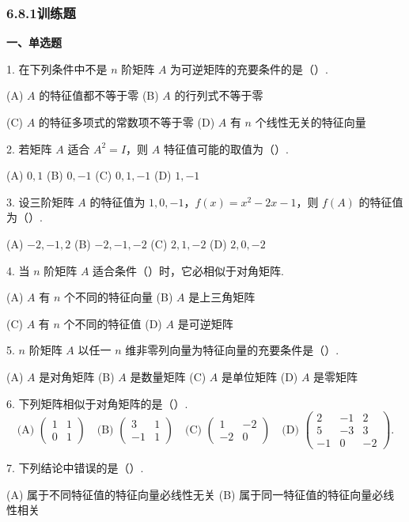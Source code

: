 \documentclass[UTF8,12pt,a4paper,fontset=fandol]{ctexart}
\begin{document}
\subsubsection*{6.8.1\quad 训练题}

\noindent\textbf{一、单选题}

1. 在下列条件中不是 $n$ 阶矩阵 $A$ 为可逆矩阵的充要条件的是（\quad ）.

(A) $A$ 的特征值都不等于零 \qquad (B) $A$ 的行列式不等于零

(C) $A$ 的特征多项式的常数项不等于零 \qquad (D) $A$ 有 $n$ 个线性无关的特征向量

2. 若矩阵 $A$ 适合 $A^2=I$，则 $A$ 特征值可能的取值为（\quad ）.

(A) $0,1$ \qquad (B) $0,-1$ \qquad (C) $0,1,-1$ \qquad (D) $1,-1$

3. 设三阶矩阵 $A$ 的特征值为 $1,0,-1$，$f(x)=x^2-2x-1$，则 $f(A)$ 的特征值为（\quad ）.

(A) $-2,-1,2$ \qquad (B) $-2,-1,-2$ \qquad (C) $2,1,-2$ \qquad (D) $2,0,-2$

4. 当 $n$ 阶矩阵 $A$ 适合条件（\quad ）时，它必相似于对角矩阵.

(A) $A$ 有 $n$ 个不同的特征向量 \qquad (B) $A$ 是上三角矩阵

(C) $A$ 有 $n$ 个不同的特征值 \qquad (D) $A$ 是可逆矩阵

5. $n$ 阶矩阵 $A$ 以任一 $n$ 维非零列向量为特征向量的充要条件是（\quad ）.

(A) $A$ 是对角矩阵 \qquad (B) $A$ 是数量矩阵 \qquad (C) $A$ 是单位矩阵 \qquad (D) $A$ 是零矩阵

6. 下列矩阵相似于对角矩阵的是（\quad ）.
\[
\text{(A) }\begin{pmatrix}1&1\\0&1\end{pmatrix}\quad
\text{(B) }\begin{pmatrix}3&1\\-1&1\end{pmatrix}\quad
\text{(C) }\begin{pmatrix}1&-2\\-2&0\end{pmatrix}\quad
\text{(D) }\begin{pmatrix}2&-1&2\\5&-3&3\\-1&0&-2\end{pmatrix}.
\]

7. 下列结论中错误的是（\quad ）.

(A) 属于不同特征值的特征向量必线性无关 \qquad (B) 属于同一特征值的特征向量必线性相关
\end{document}
